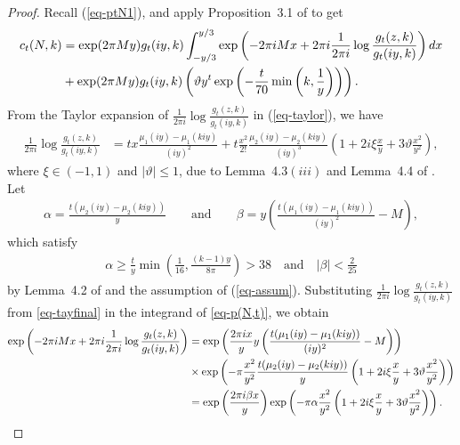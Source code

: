 \documentclass[11pt]{amsart}
\theoremstyle{plain}
\numberwithin{equation}{section}
\begin{document}
	\begin{proof}
		Recall (\ref{eq-ptN1}), and apply Proposition~3.1 of \cite{tyler} to get
		\begin{align}\label{eq-p(N,t)}
			\notag
			c_t(N,k)&=\exp(2\pi My)g_{t}(iy,k)\int_{-y/3}^{y/3}\exp\left(-2\pi i Mx+2\pi i\frac{1}{2\pi i}\log\frac{g_{t}(z,k)}{g_{t}(iy,k)}\right)dx\\
			&+\exp(2\pi My)g_{t}(iy,k)\left(\vartheta y^{t} \exp\left(-\frac{t}{70}\min \left(k,\frac{1}{y}\right) \right)\right).
		\end{align}   
		From the Taylor expansion of $\frac{1}{2\pi i}\log\frac{g_t(z,k)}{g_t(iy,k)}$ in (\ref{eq-taylor}), we have
		\begin{align}\label{eq-tayfinal}
			\frac{1}{2\pi i}\log \frac{g_{t}(z,k)}{g_{t}(iy,k)}&=tx\frac{\mu_{1}(iy)-\mu_1(kiy)}{(iy)^{2}}
			+t\frac{x^{2}}{2!}\frac{\mu_{2}(iy)-\mu_2(kiy)}{(iy)^{3}}\left(1+2i\xi\frac{x}{y}+3\vartheta \frac{x^{2}}{y^{2}}\right),
		\end{align}
		where $\xi\in(-1,1)$ and $|\vartheta|\le 1$, due to Lemma~4.3$(iii)$ and Lemma~4.4 of \cite{tyler}.
		\newline
		Let
		\begin{align}\label{eq-alpha}
			\alpha=\frac{t(\mu_{2}(iy)-\mu_2(kiy))}{y} \qquad\text{and} \qquad \beta=y\left(\frac{t(\mu_{1}(iy)-\mu_1(kiy))}{(iy)^{2}}-M\right),
		\end{align}
		which satisfy
		\begin{align*}
			\alpha\ge \frac{t}{y}\min\left(\frac{1}{16}, \frac{(k-1)y}{8\pi}\right)>38 \quad\text{and}\quad |\beta|<\frac{2}{25} 
		\end{align*}
		by Lemma~4.2 of \cite{tyler} and the assumption of (\ref{eq-assum}). Substituting $\frac{1}{2\pi i}\log\frac{g_t(z,k)}{g_t(iy,k)}$ from \eqref{eq-tayfinal} in the integrand of \eqref{eq-p(N,t)}, we obtain
		\begin{align*}%
			\notag
			\exp\left(-2\pi i Mx+2\pi i\frac{1}{2\pi i}\log\frac{g_{t}(z,k)}{g_{t}(iy,k)}\right)&=\exp\left(\frac{2\pi ix}{y}y\left(\frac{t(\mu_{1}(iy)-\mu_{1}(kiy))}{(iy)^{2}}-M\right)\right)\\
			\notag
			&\times\exp\left(-\pi\frac{x^{2}}{y^{2}}\frac{t(\mu_{2}(iy)-\mu_{2}(kiy))}{y}\left(1+2i\xi\frac{x}{y}+3\vartheta \frac{x^{2}}{y^{2}}\right)\right)\\
			&=\exp\left(\frac{2\pi i\beta x}{y}\right)\exp\left(-\pi\alpha\frac{x^{2}}{y^{2}}\left(1+2i\xi\frac{x}{y}+3\vartheta \frac{x^{2}}{y^{2}}\right)\right).
		\end{align*}

\end{proof}
\end{document}
